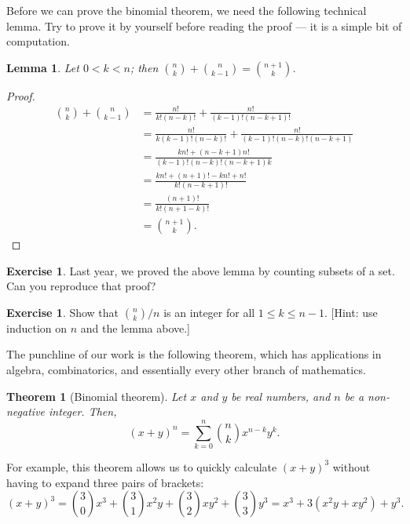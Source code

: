 \documentclass[a4paper,leqno]{article}
\numberwithin{equation}{section}
\newtheorem{thm}[equation]{Theorem}
\newtheorem{lem}[equation]{Lemma}
\theoremstyle{definition}
\newtheorem{exercise}[equation]{Exercise}
\theoremstyle{remark}
\begin{document}
Before we can prove the binomial theorem, we need the following technical lemma. Try to prove it
by yourself before reading the proof --- it is a simple bit of computation.
\begin{lem}
  Let $ 0 < k < n $; then $ \binom{n}{k} + \binom{n}{k - 1} = \binom{n + 1}{k} $.
\end{lem}
\begin{proof}
  \begin{align*}
    \binom{n}{k} + \binom{n}{k - 1} &= \frac{n!}{k! (n - k)!} + \frac{n!}{(k - 1)! (n - k + 1)!}\\
                                    &= \frac{n!}{k(k - 1)! (n - k)!} + \frac{n!}{(k - 1)! (n - k)! (n - k + 1)}\\
                                    &= \frac{kn! + (n - k + 1) n!}{(k - 1)! (n - k)! (n - k + 1)k}\\
                                    &= \frac{kn! + (n + 1)! - kn! + n!}{k!(n - k + 1)!}\\
                                    &= \frac{(n + 1)!}{k!(n + 1 - k)!}\\
                                    &= \binom{n + 1}{k}.
  \end{align*}
\end{proof}

\begin{exercise}
  Last year, we proved the above lemma by counting subsets of a set. Can you reproduce that proof?
\end{exercise}
\begin{exercise}
  Show that $ \binom{n}{k}/n $ is an integer for all $ 1 \leq k \leq n - 1 $. [Hint: use induction on $ n $ and the lemma above.]
\end{exercise}

The punchline of our work is the following theorem, which has applications in algebra, combinatorics, and essentially every other
branch of mathematics.

\begin{thm}[Binomial theorem]
  Let $ x $ and $ y $ be real numbers, and $ n $ be a non-negative integer. Then,
  \begin{displaymath}
    (x + y)^n = \sum_{k = 0}^n \binom{n}{k} x^{n - k} y^k.
  \end{displaymath}
\end{thm}

For example, this theorem allows us to quickly calculate $ (x + y)^3 $ without having to expand three pairs of brackets:
\begin{equation}
  (x + y)^3 = \binom{3}{0} x^3 + \binom{3}{1} x^2 y + \binom{3}{2} x y^2 + \binom{3}{3} y^3 = x^3 + 3(x^2 y + xy^2) + y^3.
\end{equation}
\end{document}
